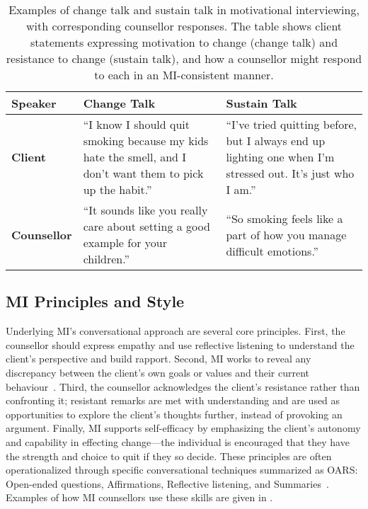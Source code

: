 \begin{table}[ht!]
	\centering
	\begin{tabular}{@{} p{} p{} p{} @{}}
		\toprule
		\textbf{Speaker}                                                                                             & \textbf{Change Talk} & \textbf{Sustain Talk} \\
		\midrule
		\textbf{Client}                                                                                              &
		``I know I should quit smoking because my kids hate the smell, and I don't want them to pick up the habit.'' &
		``I've tried quitting before, but I always end up lighting one when I'm stressed out. It's just who I am.''                                                 \\
		\addlinespace
		\textbf{Counsellor}                                                                                          &
		``It sounds like you really care about setting a good example for your children.''                           &
		``So smoking feels like a part of how you manage difficult emotions.''                                                                                      \\
		\bottomrule
	\end{tabular}
	\caption[Examples of change talk and sustain talk]{Examples of change talk and sustain talk in motivational interviewing, with corresponding counsellor responses. The table shows client statements expressing motivation to change (change talk) and resistance to change (sustain talk), and how a counsellor might respond to each in an MI-consistent manner.}
	\label{tab:change_sustain_talk}
\end{table}



\subsection*{MI Principles and Style}
Underlying MI's conversational approach are several core principles. First, the counsellor should express empathy and use reflective listening to understand the client's perspective and build rapport. Second, MI works to reveal any discrepancy between the client's own goals or values and their current behaviour~\cite{Miller_2023}. Third, the counsellor acknowledges the client's resistance rather than confronting it; resistant remarks are met with understanding and are used as opportunities to explore the client's thoughts further, instead of provoking an argument. Finally, MI supports self-efficacy by emphasizing the client's autonomy and capability in effecting change---the individual is encouraged that they have the strength and choice to quit if they so decide. These principles are often operationalized through specific conversational techniques summarized as OARS: Open-ended questions, Affirmations, Reflective listening, and Summaries~\cite{Rollnick1995}. Examples of how MI counsellors use these skills are given in .


